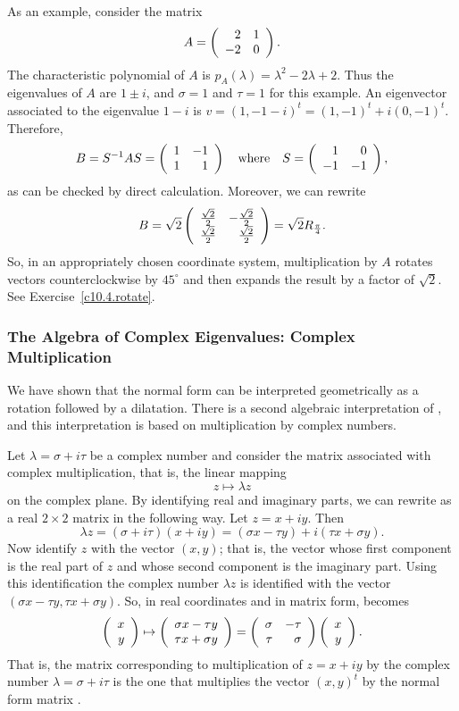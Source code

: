 As an example, consider the matrix
\begin{equation}  \label{E:exampA}
A = \left(\begin{array}{rr} 2 & 1\\ -2 &0\end{array}\right).
\end{equation}
The characteristic polynomial
of $A$ is $p_A(\lambda)=\lambda^2-2\lambda+2$.
Thus the eigenvalues of $A$ are $1\pm i$, and $\sigma=1$ and $\tau=1$ for
this example.  An eigenvector associated to the eigenvalue $1-i$ is 
$v=(1,-1-i)^t=(1,-1)^t+i(0,-1)^t$. Therefore, 
\[
B = S^{-1} A S = \left(\begin{array}{rr} 1 & -1\\ 1 &1\end{array}\right) \quad\mbox{where}\quad 
S = \left(\begin{array}{rr} 1 & 0\\ -1 &-1\end{array}\right),
\]
as can be checked by direct calculation.  Moreover, we can rewrite
\[
B = \sqrt{2}\left(\begin{array}{rr} \frac{\sqrt{2}}{2} & -\frac{\sqrt{2}}{2}\\ \frac{\sqrt{2}}{2} &\frac{\sqrt{2}}{2}\end{array}\right) =
\sqrt{2}R_{\frac{\pi}{4}}.
\]
So, in an appropriately chosen coordinate system, multiplication by $A$ rotates
vectors counterclockwise by $45^\circ$ and then expands the result by a 
factor of $\sqrt{2}$.  See Exercise~\ref{c10.4.rotate}.

\subsubsection*{The Algebra of Complex Eigenvalues: Complex Multiplication}

We have shown that the normal form  can 
be interpreted geometrically as a rotation followed by a dilatation.  There 
is a second algebraic interpretation of , and this 
interpretation is based on multiplication by complex numbers.

Let $\lambda=\sigma+i\tau$ be a complex number and consider the matrix 
associated with complex multiplication, that is, the linear mapping
\begin{equation}  \label{e:cplxmap}
z\mapsto \lambda z
\end{equation}
on the complex plane.  By identifying real and imaginary parts, we can 
rewrite  as a real $2\times 2$ matrix in the following way. 
Let $z=x + iy$.  Then
\[
\lambda z = (\sigma+i\tau)(x+iy) = (\sigma x - \tau y) + 
i(\tau x + \sigma y).
\]
Now identify $z$ with the vector $(x,y)$; that is, the vector whose first
component is the real part of $z$ and whose second component is the 
imaginary part.  Using this identification the complex number $\lambda z$
is identified with the vector $(\sigma x - \tau y,\tau x + \sigma y)$. 
So, in real coordinates and in matrix form,  becomes
\[
\left(\begin{array}{r} x \\ y\end{array}\right)\mapsto \left(\begin{array}{r} \sigma x - \tau y \\ \tau x + \sigma y\end{array}\right) =
\left(\begin{array}{rr} \sigma & -\tau\\ \tau &\sigma\end{array}\right) \left(\begin{array}{r} x \\ y\end{array}\right).
\]
That is, the matrix corresponding to multiplication of $z=x+iy$ by the 
complex number $\lambda=\sigma+i\tau$ is the one that multiplies the 
vector $(x,y)^t$ by the normal form matrix .

